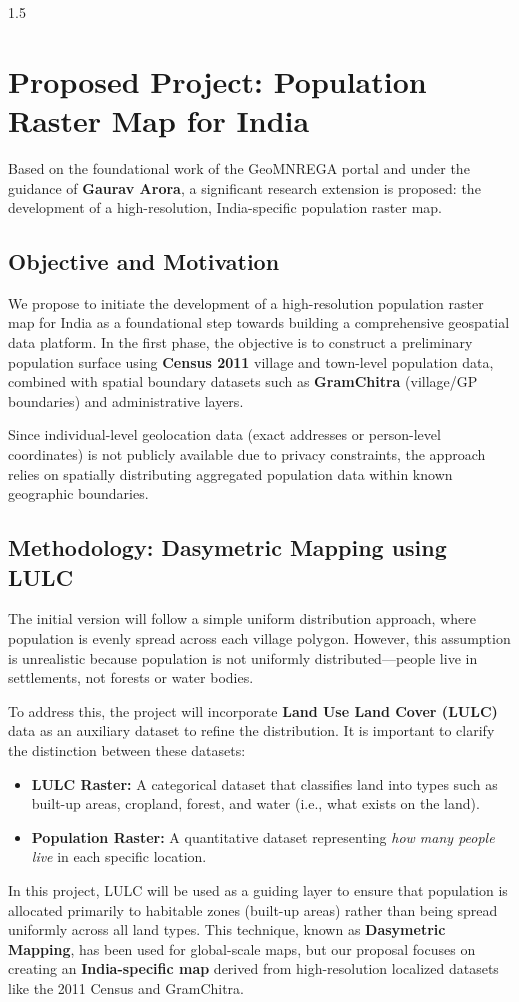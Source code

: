 \documentclass[12pt,a4paper]{report}
\begin{document}
\begin{spacing}{1.5}
\section{Proposed Project: Population Raster Map for India}
Based on the foundational work of the GeoMNREGA portal and under the guidance of \textbf{Gaurav Arora}, a significant research extension is proposed: the development of a high-resolution, India-specific population raster map.

\subsection{Objective and Motivation}
We propose to initiate the development of a high-resolution population raster map for India as a foundational step towards building a comprehensive geospatial data platform. In the first phase, the objective is to construct a preliminary population surface using \textbf{Census 2011} village and town-level population data, combined with spatial boundary datasets such as \textbf{GramChitra} (village/GP boundaries) and administrative layers. 

Since individual-level geolocation data (exact addresses or person-level coordinates) is not publicly available due to privacy constraints, the approach relies on spatially distributing aggregated population data within known geographic boundaries.

\subsection{Methodology: Dasymetric Mapping using LULC}
The initial version will follow a simple uniform distribution approach, where population is evenly spread across each village polygon. However, this assumption is unrealistic because population is not uniformly distributed—people live in settlements, not forests or water bodies. 

To address this, the project will incorporate \textbf{Land Use Land Cover (LULC)} data as an auxiliary dataset to refine the distribution. It is important to clarify the distinction between these datasets:
\begin{itemize}
    \item \textbf{LULC Raster:} A categorical dataset that classifies land into types such as built-up areas, cropland, forest, and water (i.e., what exists on the land).
    \item \textbf{Population Raster:} A quantitative dataset representing \textit{how many people live} in each specific location.
\end{itemize}
In this project, LULC will be used as a guiding layer to ensure that population is allocated primarily to habitable zones (built-up areas) rather than being spread uniformly across all land types. This technique, known as \textbf{Dasymetric Mapping}, has been used for global-scale maps, but our proposal focuses on creating an \textbf{India-specific map} derived from high-resolution localized datasets like the 2011 Census and GramChitra.


\end{spacing}
\end{document}
